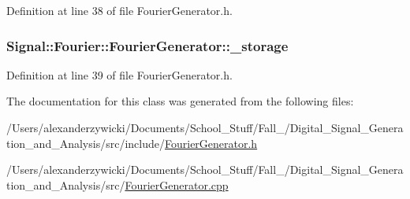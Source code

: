 Definition at line 38 of file Fourier\+Generator.\+h.

\hypertarget{classSignal_1_1Fourier_1_1FourierGenerator_ab6e6b79cf56e31c9a1b5766f357f8cfb}{
\subsubsection[{\+\_\+storage}]{ Signal\+::\+Fourier\+::\+Fourier\+Generator\+::\+\_\+storage\hspace{0.3cm}{\ttfamily [protected]}}}\label{classSignal_1_1Fourier_1_1FourierGenerator_ab6e6b79cf56e31c9a1b5766f357f8cfb}


Definition at line 39 of file Fourier\+Generator.\+h.



The documentation for this class was generated from the following files\+:\begin{DoxyCompactItemize}
\item 
/\+Users/alexanderzywicki/\+Documents/\+School\+\_\+\+Stuff/\+Fall\+\_/\+Digital\+\_\+\+Signal\+\_\+\+Generation\+\_\+and\+\_\+\+Analysis/src/include/\hyperlink{FourierGenerator_8h}{Fourier\+Generator.\+h}\item 
/\+Users/alexanderzywicki/\+Documents/\+School\+\_\+\+Stuff/\+Fall\+\_/\+Digital\+\_\+\+Signal\+\_\+\+Generation\+\_\+and\+\_\+\+Analysis/src/\hyperlink{FourierGenerator_8cpp}{Fourier\+Generator.\+cpp}\end{DoxyCompactItemize}
